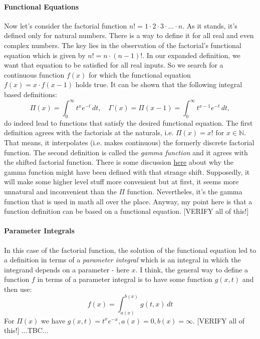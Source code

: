 \paragraph{Functional Equations}
Now let's consider the factorial function $n! = 1 \cdot 2 \cdot 3 \cdot \ldots \cdot n$. As it stands, it's defined only for natural numbers. There is a way to define it for all real and even complex numbers. The key lies in the observation of the factorial's functional equation which is given by $n! = n \cdot (n-1)!$. In our expanded definition, we want that equation to be satisfied for all real inputs. So we search for a continuous function $f(x)$ for which the functional equation $f(x) = x \cdot f(x-1)$ holds true. It can be shown that the following integral based definitions:
\begin{equation}
\Pi(x)    = \int_0^\infty t^x e^{-t} \, dt, \quad
\Gamma(x) = \Pi(x-1) = \int_0^\infty t^{x-1} e^{-t} \, dt,
\end{equation}
do indeed lead to functions that satisfy the desired functional equation. The first definition agrees with the factorials at the naturals, i.e. $\Pi(x) = x!$ for $x \in \mathbb{N}$. That means, it interpolates (i.e. makes continuous) the formerly discrete factorial function. The second definition is called the \emph{gamma function} and it agrees with the shifted factorial function. There is some discussion
\href{https://math.stackexchange.com/questions/1362523/why-is-the-gamma-function-off-by-1-from-the-factorial}{here} about why the gamma function might have been defined with that strange shift. Supposedly, it will make some higher level stuff more convenient but at first, it seems more unnatural and inconvenient than the $\Pi$ function. Nevertheles, it's the gamma function that is used in math all over the place. Anyway, my point here is that a function definition can be based on a functional equation. 
[VERIFY all of this!]

\paragraph{Parameter Integrals}
In this case of the factorial function, the solution of the functional equation led to a definition in terms of a \emph{parameter integral} which is an integral in which the integrand depends on a parameter - here $x$.
I think, the general way to define a function $f$ in terms of a parameter integral is to have some function $g(x,t)$ and then use:
\begin{equation}
 f(x)  = \int_{a(x)}^{b(x)} g(t,x) \, dt
\end{equation}
For $\Pi(x)$ we have $g(x,t) = t^x e^{-x}, a(x) = 0, b(x) = \infty$.
[VERIFY all of this!]
...TBC...

